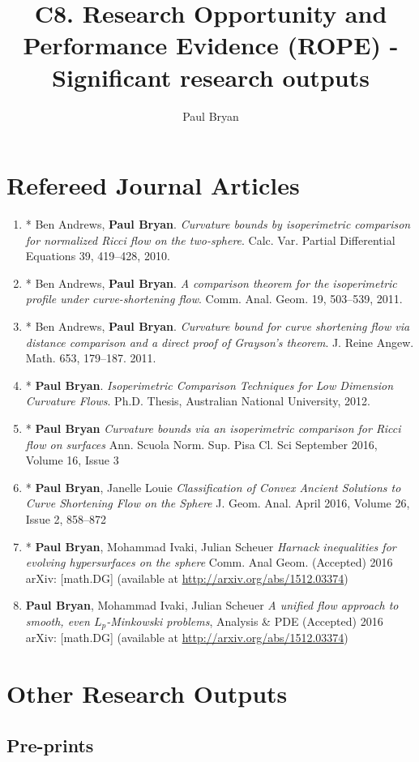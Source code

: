 \documentclass[12pt]{amsart}
\date{}
\author{Paul Bryan}
\date{}
\title{C8. Research Opportunity and Performance Evidence (ROPE) - Significant research outputs}
\begin{document}
\section*{\textbf{Refereed Journal Articles}}
\label{sec-1}

\begin{enumerate}
\item * Ben Andrews, \textbf{Paul Bryan}. \emph{Curvature bounds by isoperimetric comparison for normalized Ricci flow on the two-sphere}. Calc. Var. Partial Differential Equations 39, 419--428, 2010.
\item * Ben Andrews, \textbf{Paul Bryan}. \emph{A comparison theorem for the isoperimetric profile under curve-shortening flow}. Comm. Anal. Geom. 19, 503--539, 2011.
\item * Ben Andrews, \textbf{Paul Bryan}. \emph{Curvature bound for curve shortening flow via distance comparison and a direct proof of Grayson's theorem}. J. Reine Angew. Math. 653, 179--187. 2011.
\item * \textbf{Paul Bryan}. \emph{Isoperimetric Comparison Techniques for Low Dimension Curvature Flows}. Ph.D. Thesis, Australian National University, 2012.
\item * \textbf{Paul Bryan} \emph{Curvature bounds via an isoperimetric comparison for Ricci flow on surfaces} Ann. Scuola Norm. Sup. Pisa Cl. Sci September 2016, Volume 16, Issue 3
\item * \textbf{Paul Bryan}, Janelle Louie \emph{Classification of Convex Ancient Solutions to Curve Shortening Flow on the Sphere} J. Geom. Anal. April 2016, Volume 26, Issue 2, 858--872
\item * \textbf{Paul Bryan}, Mohammad Ivaki, Julian Scheuer \emph{Harnack inequalities for evolving hypersurfaces on the sphere} Comm. Anal Geom. (Accepted) 2016 arXiv: [math.DG] (available at \url{http://arxiv.org/abs/1512.03374})
\item \textbf{Paul Bryan}, Mohammad Ivaki, Julian Scheuer \emph{A unified flow approach to smooth, even $L_p$-Minkowski problems}, Analysis \& PDE (Accepted) 2016 arXiv: [math.DG] (available at \url{http://arxiv.org/abs/1512.03374})
\end{enumerate}

\section*{\textbf{Other Research Outputs}}
\label{sec-2}
\subsection*{Pre-prints}
\label{sec-2-1}
\end{document}
